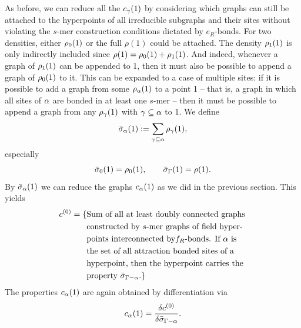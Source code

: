 \documentclass[8.5pt,twoside,twocolumn]{article}
\newcommand\cze{\enmat{c^{(0)}}}
\newcommand\roz{\enmat{\rho_0}}
\newcommand\rone{\enmat{\rho_1}}
\newcommand\ral{\enmat{\rho_{\al}}}
\newcommand\rga{\enmat{\rho_{\ga}}}
\newcommand\calp{\enmat{c_{\al}}}
\newcommand\cga{\enmat{c_{\ga}}}
\newcommand\sal{\enmat{\si_{\al}}}
\newcommand\sigal{\enmat{\si_{\Ga-\al}}}
\theoremstyle{standard}
\begin{document}
As before, we can reduce all the $\cga(1)$ by considering which graphs can still be attached to the 
hyperpoints of all irreducible subgraphs and their sites without violating the $s$-mer construction
conditions dictated by
$e_R$-bonds. For two densities, either $\roz(1)$ or the full $\rho(1)$ could be attached. The
density $\rone(1)$ is only indirectly included since $\rho(1)=\roz(1)+\rone(1)$. And indeed,
whenever a graph of $\rone(1)$ can be appended to 1, then it must also be possible to
append a graph of $\roz(1)$ to it. This can be expanded to a case of multiple sites: if it is
possible to add a graph from some $\ral(1)$ to a point 1 -- that is, a graph in which all sites of
$\alpha$ are bonded in at least one $s$-mer -- then it must be possible to append a graph from
any $\rho_{\gamma}(1)$ with $\gamma \subseteq \alpha$ to 1. We define
\begin{equation}
\sal(1):=\sum_{\ga \suseq \al} \rga(1),
\label{WH:sal}
\end{equation} 
especially
\begin{equation}
\si_0(1)=\roz(1), \qquad \si_\Ga(1)=\rho(1).
\label{WH:si0,siGa}
\end{equation}
By $\sal(1)$ we can reduce the graphs $\calp(1)$ as we did in the previous section. This yields
\begin{equation}
\begin{aligned}
\cze=\{&\te{Sum of all at least doubly connected graphs}\\
&\te{constructed by } s \te{-mer graphs of field hyper-}\\
&\te{points interconnected by} f_R \te{-bonds. If } \al \te{ is}\\
&\te{the set of all attraction bonded sites of a}\\
&\te{hyperpoint, then the hyperpoint carries the }\\
&\te{property }\sigal.\}
\end{aligned}
\label{WH:czeMultDens}
\end{equation}
The properties $\calp(1)$ are again obtained by differentiation via
\begin{equation}
\calp(1)=\delti{\cze}{\sigal}.
\label{WH:MultDens:calpdiff}
\end{equation}
\end{document}
